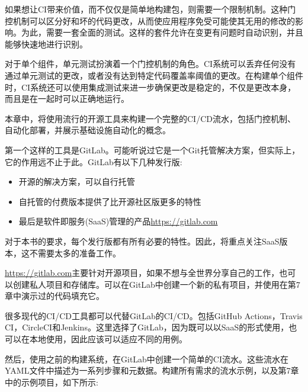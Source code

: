 
如果想让CI带来价值，而不仅仅是简单地构建包，则需要一个限制机制。这种门控机制可以区分好和坏的代码更改，从而使应用程序免受可能使其无用的修改的影响。为此，需要一套全面的测试。这样的套件允许在变更有问题时自动识别，并且能够快速地进行识别。

对于单个组件，单元测试扮演着一个门控机制的角色。CI系统可以丢弃任何没有通过单元测试的更改，或者没有达到特定代码覆盖率阈值的更改。在构建单个组件时，CI系统还可以使用集成测试来进一步确保更改是稳定的，不仅是更改本身，而且是在一起时可以正确地运行。


本章中，将使用流行的开源工具来构建一个完整的CI/CD流水，包括门控机制、自动化部署，并展示基础设施自动化的概念。

第一个这样的工具是GitLab。可能听说过它是一个Git托管解决方案，但实际上，它的作用远不止于此。GitLab有以下几种发行版:

\begin{itemize}
\item 
开源的解决方案，可以自行托管

\item 
自托管的付费版本提供了比开源社区版更多的特性

\item 
最后是软件即服务(SaaS)管理的产品\url{https://gitlab.com}
\end{itemize}

对于本书的要求，每个发行版都有所有必要的特性。因此，将重点关注SaaS版本，这不需要太多的准备工作。

\url{https://gitlab.com}主要针对开源项目，如果不想与全世界分享自己的工作，也可以创建私人项目和存储库。可以在GitLab中创建一个新的私有项目，并使用在第7章中演示过的代码填充它。

很多现代的CI/CD工具都可以代替GitLab的CI/CD。包括GitHub Actions，Travis CI，CircleCI和Jenkins。这里选择了GitLab，因为既可以以SaaS的形式使用，也可以在本地使用，因此应该可以适应不同的用例。

然后，使用之前的构建系统，在GitLab中创建一个简单的CI流水。这些流水在YAML文件中描述为一系列步骤和元数据。构建所有需求的流水示例，以及第7章中的示例项目，如下所示:

